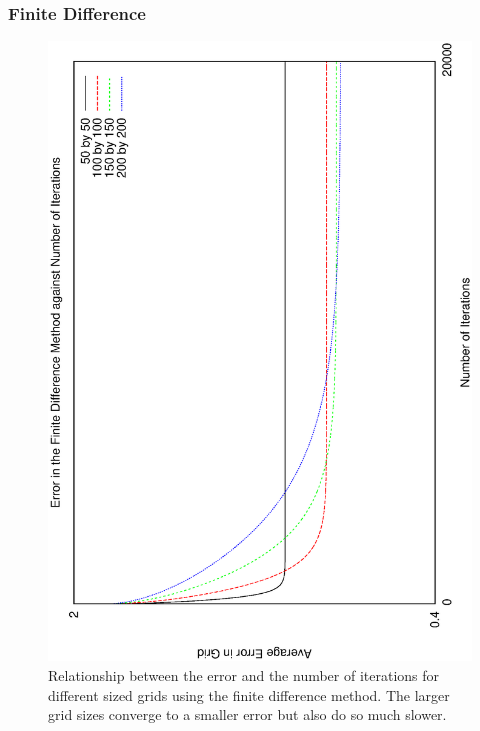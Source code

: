 \documentclass[aps,twocolumn,pre,nofootinbib,10pt]{revtex4-1}
\begin{document}
\subsubsection{Finite Difference}

\begin{figure}
\includegraphics[height=\breite \columnwidth,angle=-90]{fd_it.eps}

\caption{Relationship between the error and the number of iterations for different sized grids using the finite difference method. The larger grid sizes converge to a smaller error but also do so much slower.}
\label{fig:fd}
\end{figure}
\end{document}
